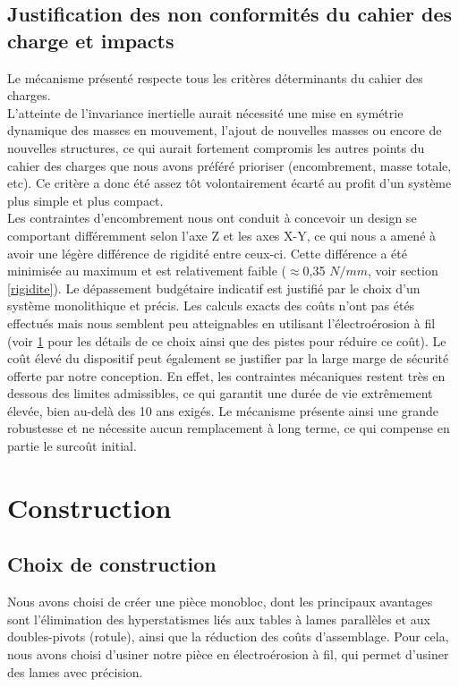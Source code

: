 \documentclass[a4paper, 11pt]{article} %
\begin{document}
\subsection{Justification des non conformités du cahier des charge et impacts}
Le mécanisme présenté respecte tous les critères déterminants du cahier des charges. \\
L'atteinte de l'invariance inertielle aurait nécessité une mise en symétrie dynamique des masses en mouvement, l'ajout de nouvelles masses ou encore de nouvelles structures, ce qui aurait fortement compromis les autres points du cahier des charges que nous avons préféré prioriser (encombrement, masse totale, etc). Ce critère a donc été assez tôt volontairement écarté au profit d'un système plus simple et plus compact.\\
Les contraintes d'encombrement nous ont conduit à concevoir un design se comportant différemment selon l'axe Z et les axes X-Y, ce qui nous a amené à avoir une légère différence de rigidité entre ceux-ci. Cette différence a été minimisée au maximum et est relativement faible ($\approx$0,35 $N/mm$, voir section \ref{rigidite}).
Le dépassement budgétaire indicatif est justifié par le choix d'un système monolithique et précis. Les calculs exacts des coûts n'ont pas étés effectués mais nous semblent peu atteignables en utilisant l'électroérosion à fil (voir \ref{sub:construction} pour les détails de ce choix ainsi que des pistes pour réduire ce coût). Le coût élevé du dispositif peut également se justifier par la large marge de sécurité offerte par notre conception. En effet, les contraintes mécaniques restent très en dessous des limites admissibles, ce qui garantit une durée de vie extrêmement élevée, bien au-delà des 10 ans exigés. Le mécanisme présente ainsi une grande robustesse et ne nécessite aucun remplacement à long terme, ce qui compense en partie le surcoût initial.




\section{Construction}
\label{sub:construction}
\subsection{Choix de construction}
\label{choix_construction}
Nous avons choisi de créer une pièce monobloc, dont les principaux avantages sont l’élimination des hyperstatismes liés aux tables à lames parallèles et aux doubles-pivots (rotule), ainsi que la réduction des coûts d’assemblage. Pour cela, nous avons choisi d'usiner notre pièce en électroérosion à fil, qui permet d'usiner des lames avec précision.\\
\end{document}
